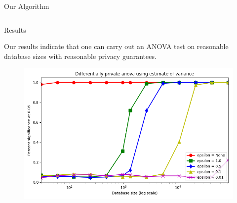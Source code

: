 \documentclass[final]{beamer}
\newlength{\onecolwid}
\newlength{\twocolwid}
\begin{document}
\begin{frame}[t]
\begin{columns}[t]
\begin{column}{\twocolwid}
\begin{columns}[t,totalwidth=\twocolwid]
\begin{column}{\onecolwid}
\begin{block}{Our Algorithm}
\end{block}


\end{column} %

\end{columns} %








\begin{block}{Results}

Our results indicate that one can carry out an ANOVA test on reasonable database sizes with 
reasonable privacy guarantees. 

\begin{center}
\begin{figure}
\includegraphics[width=.85\linewidth]{varest1000_1.png}
\end{figure}
\end{center}


\end{block}
\end{column}
\end{columns}
\end{frame}
\end{document}
